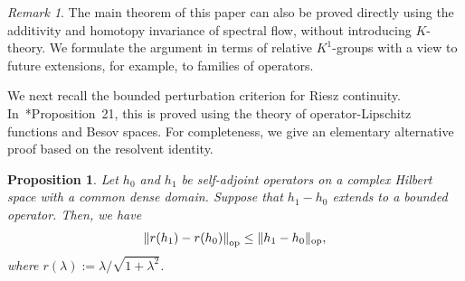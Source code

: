 \documentclass[a4paper,oneside,12pt]{amsart}
\theoremstyle{plain}
\newtheorem{proposition}[theorem]{Proposition}
\theoremstyle{definition}
\theoremstyle{remark}
\newtheorem{remark}[theorem]{Remark}
\DeclarePairedDelimiter{\operatornorm}{\lVert}{\rVert_{\mathrm{op}}}
\begin{document}
\begin{remark}
  The main theorem of this paper can also be proved directly using the additivity and homotopy invariance of spectral flow, without introducing $K$-theory.
  We formulate the argument in terms of relative $K^1$-groups with a view to future extensions, for example, to families of operators.
\end{remark}

We next recall the bounded perturbation criterion for Riesz continuity.
In~\cite{afffmoy}*{Proposition~21}, this is proved using the theory of operator-Lipschitz functions and Besov spaces.
For completeness, we give an elementary alternative proof based on the resolvent identity.
\begin{proposition}\label{proposition: bounded perturbations and Riesz continuity}
  Let $h_0$ and $h_1$ be self-adjoint operators on a complex Hilbert space with a common dense domain.
  Suppose that $h_1-h_0$ extends to a bounded operator.
  Then, we have
  \begin{equation}
    \operatornorm*{r(h_1) - r(h_0)} \le \operatornorm{h_1-h_0},
  \end{equation}
  where $r(\lambda) := \lambda/\sqrt{1+\lambda^2}$.
\end{proposition}
\end{document}
